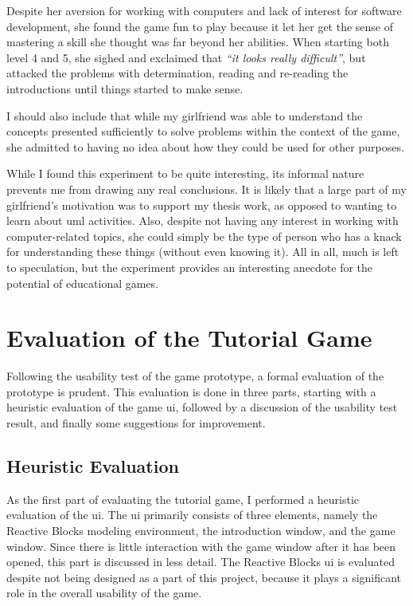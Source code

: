 \noindent
Despite her aversion for working with computers and lack of interest for software development, she found the game fun to play because it let her get the sense of mastering a skill she thought was far beyond her abilities. When starting both level 4 and 5, she sighed and exclaimed that \emph{``it looks really difficult''}, but attacked the problems with determination, reading and re-reading the introductions until things started to make sense.

\noindent
I should also include that while my girlfriend was able to understand the concepts presented sufficiently to solve problems within the context of the game, she admitted to having no idea about how they could be used for other purposes.

\noindent
While I found this experiment to be quite interesting, its informal nature prevents me from drawing any real conclusions. It is likely that a large part of my girlfriend's motivation was to support my thesis work, as opposed to wanting to learn about \gls{uml} activities. Also, despite not having any interest in working with computer-related topics, she could simply be the type of person who has a knack for understanding these things (without even knowing it). All in all, much is left to speculation, but the experiment provides an interesting anecdote for the potential of educational games.

\section{Evaluation of the Tutorial Game}
\label{sec:game_evaluation}
Following the usability test of the game prototype, a formal evaluation of the prototype is prudent. This evaluation is done in three parts, starting with a heuristic evaluation of the game \gls{ui}, followed by a discussion of the usability test result, and finally some suggestions for improvement.

\subsection{Heuristic Evaluation}
\label{sec:game_heuristic_evaluation}
As the first part of evaluating the tutorial game, I performed a heuristic evaluation of the \gls{ui}. The \gls{ui} primarily consists of three elements, namely the Reactive Blocks modeling environment, the introduction window, and the game window. Since there is little interaction with the game window after it has been opened, this part is discussed in less detail. The Reactive Blocks \gls{ui} is evaluated despite not being designed as a part of this project, because it plays a significant role in the overall usability of the game.

